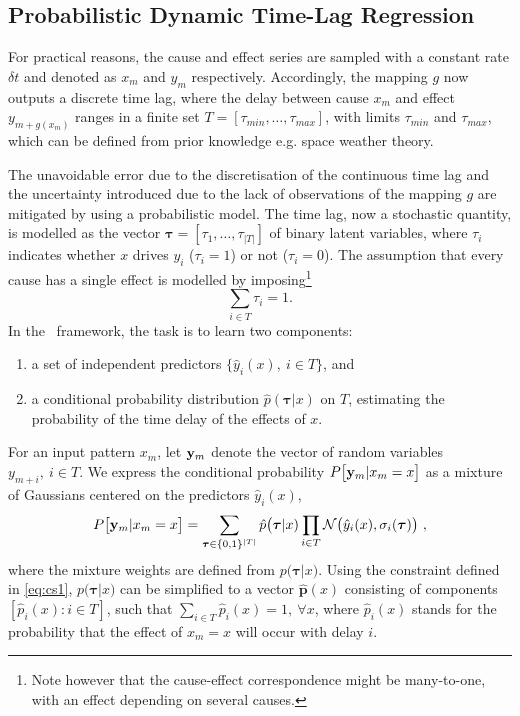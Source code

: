 \subsection{Probabilistic Dynamic Time-Lag Regression}

For practical reasons, the cause and effect series are sampled with a constant rate $\delta t$ and 
denoted as ${x_m}$ and ${y_m}$ respectively. Accordingly, the mapping $g$ now outputs a discrete 
time lag, where the delay between cause $x_m$ and effect $y_{m+g(x_m)}$ ranges in a finite set 
$T = [\tau_{min}, \ldots, \tau_{max}]$, with limits $\tau_{min}$ and  $\tau_{max}$, which can 
be defined from prior knowledge e.g. space weather theory. 

The unavoidable error due to the discretisation of the continuous time lag and the uncertainty 
introduced due to the lack of observations of the mapping $g$ are mitigated by using a 
probabilistic model. The time lag, now a stochastic quantity, is modelled as the vector 
$\boldsymbol{\tau} = [\tau_1, \dots, \tau_{\rvert T \rvert}]$ of binary latent variables, 
where $\tau_i$ indicates whether $x$ drives $y_i$ ($\tau_i=1$) or not ($\tau_i=0$). The 
assumption that every cause has a single effect is modelled by imposing\footnote{Note however 
that the cause-effect correspondence might be many-to-one, with an effect depending on several 
causes.}
%
\begin{equation}\label{eq:cs1}
\sum_{i \in T} \tau_i = 1.
\end{equation}
%
In the \XX \ framework, the task is to learn two components: 
\begin{enumerate}
  \item a set of independent predictors $\{\hat y_i(x),\ i \in T\}$, and
  \item a conditional probability distribution $\hat p(\boldsymbol{\tau} \rvert x)$ on $T$, 
        estimating the probability of the time delay of the effects of $x$.
\end{enumerate} 
%
For an input pattern $x_m$, let ${\bf y}_m$ denote the vector of random variables 
$y_{m+i},\ i \in T$. We express the conditional probability $P\bigl[{\bf y}_{m}\vert x_m=x\bigr]$ 
as a mixture of Gaussians centered on the predictors $\hat y_i(x)$, 
%
\begin{equation}\label{eq:py}
  P\bigl[{\bf y}_{m}\vert x_m=x\bigr] = 
  \sum_{\boldsymbol{\tau}\in \{0,1\}^{\rvert T \rvert}} \hat p\bigl(\boldsymbol{\tau}\vert x) 
  \prod_{i\in T} {\cal N}\bigl(\hat y_i(x),\sigma_i(\boldsymbol{\tau})\bigr) \ ,
\end{equation}
%
where the mixture weights are defined from $p\bigl(\boldsymbol{\tau}\vert x)$. Using the constraint 
defined in \cref{eq:cs1}, $p\bigl(\boldsymbol{\tau}\vert x)$ can be simplified to a vector 
$\hat{\mathbf{p}}(x)$ consisting of components $[\hat p_i(x): i \in T]$, such that 
$\sum_{i \in T}{\hat p_i(x)} = 1,\ \forall x$, where $\hat p_i(x)$ stands for the probability that 
the effect of $x_m=x$ will occur with delay $i$.

